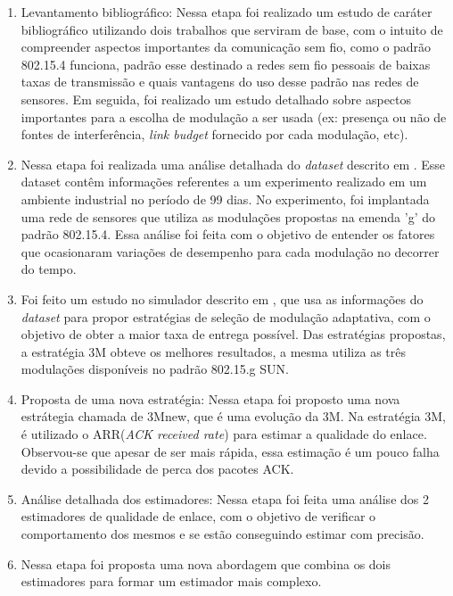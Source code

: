 \begin{enumerate}
    \item Levantamento bibliográfico: Nessa etapa foi realizado um estudo de caráter bibliográfico utilizando dois trabalhos que serviram de base\cite{tuset2020evaluating}\cite{gomes2020improving}, com o intuito de compreender aspectos importantes da comunicação sem fio, como o padrão 802.15.4 funciona, padrão esse destinado a redes sem fio pessoais de baixas taxas de transmissão e quais vantagens do uso desse padrão nas redes de sensores. 
    Em seguida, foi realizado um estudo detalhado sobre aspectos importantes para a escolha de modulação a ser usada (ex: presença ou não de fontes de interferência, \textit {link budget} fornecido por cada modulação, etc).
 
    \item  Nessa etapa foi realizada uma análise detalhada do \textit{dataset} descrito em \cite{tuset2020evaluating}. Esse dataset contêm informações referentes a um experimento realizado em um ambiente industrial no período de 99 dias. No experimento, foi implantada uma rede de sensores que utiliza as modulações propostas na emenda 'g' do padrão 802.15.4. Essa análise foi feita com o objetivo de entender os fatores que ocasionaram variações de desempenho para cada modulação no decorrer do tempo. %
    
    \item Foi feito um estudo no simulador descrito em \cite{gomes2020improving}, que usa as informações do \textit{dataset} para propor estratégias de seleção de modulação adaptativa, com o objetivo de obter a maior taxa de entrega possível. Das estratégias propostas, a estratégia 3M obteve os melhores resultados, a mesma utiliza as três modulações disponíveis no padrão 802.15.g SUN. 
    
    \item Proposta de uma nova estratégia: Nessa etapa foi proposto uma nova estrátegia chamada de 3Mnew, que é uma evolução da 3M\cite{gomes2020improving}. Na estratégia 3M, é utilizado o ARR(\textit{ACK received rate}) para estimar a qualidade do enlace. Observou-se que apesar de ser mais rápida, essa estimação é um pouco falha devido a possibilidade de perca dos pacotes ACK. %
    
    \item Análise detalhada dos estimadores: Nessa etapa foi feita uma análise dos 2 estimadores de qualidade de enlace, com o objetivo de verificar o comportamento dos mesmos e se estão conseguindo estimar com precisão.
    
    \item Nessa etapa foi proposta uma nova abordagem que combina os dois estimadores para formar um estimador mais complexo. 
\end{enumerate}

